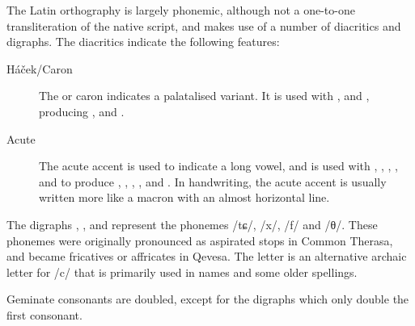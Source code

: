 \documentclass[grammar]{subfiles}
\begin{document}
The Latin orthography is largely phonemic, although not a one-to-one
transliteration of the native script, and makes use of a number of diacritics
and digraphs.  The diacritics indicate the following features:

\begin{description}
  \item[Háček/Caron] The  or caron indicates a palatalised
    variant.  It is used with ,  and , producing , 
    and .
  \item[Acute] The acute accent is used to indicate a long vowel, and is used
    with , , , ,  and  to produce , , ,
    ,  and .  In handwriting, the acute accent is usually written more
    like a macron with an almost horizontal line. 
\end{description}

The digraphs , ,  and  represent the phonemes /tɕ/,
/x/, /f/ and /θ/.  These phonemes were originally pronounced as aspirated stops
in Common Therasa, and became fricatives or affricates in Qevesa. The letter
 is an alternative archaic letter for /c/ that is primarily used in names
and some older spellings.

Geminate consonants are doubled, except for the digraphs which only double the
first consonant.  
\end{document}
